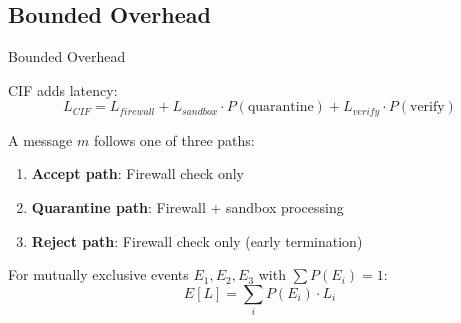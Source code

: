 \documentclass[
  ignorenonframetext,
]{beamer}
\begin{document}
\begin{frame}
\end{frame}

\subsection{Bounded Overhead}\label{sec:thm511-proof}

\begin{frame}[allowframebreaks]{Bounded Overhead}
\begin{theorem}
\label{thm:overhead-restated}
CIF adds latency:
\begin{equation}
\label{eq:overhead-restated}
L_{CIF} = L_{firewall} + L_{sandbox} \cdot P(\text{quarantine}) + L_{verify} \cdot P(\text{verify})
\end{equation}
\end{theorem}

\begin{definition}
\label{def:processing-path}
A message $m$ follows one of three paths:
\begin{enumerate}
\item \textbf{Accept path}: Firewall check only
\item \textbf{Quarantine path}: Firewall + sandbox processing
\item \textbf{Reject path}: Firewall check only (early termination)
\end{enumerate}
\end{definition}

\begin{lemma}
\label{lem:expected-decomposition}
For mutually exclusive events $E_1, E_2, E_3$ with $\sum P(E_i) = 1$:
\begin{equation}
\label{eq:expected-decomposition}
E[L] = \sum_i P(E_i) \cdot L_i
\end{equation}
\end{lemma}

\end{frame}
\end{document}
